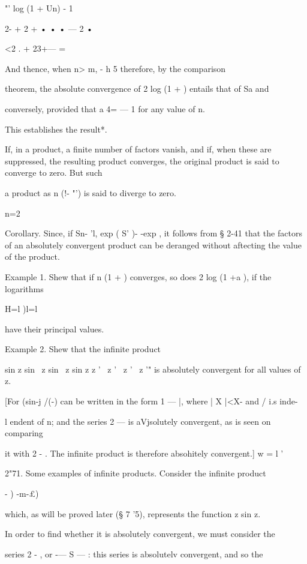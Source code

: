   "' log (1 + Un) - 1



2- + 2 + • • • — 2 •



<2 . + 23+--- =

And thence, when n> m, - h 5 therefore, by the comparison

theorem, the absolute convergence of 2 log (1 + ) entails that of Sa
and

conversely, provided that a 4= — 1 for any value of n.

This establishes the result*.

If, in a product, a finite number of factors vanish, and if, when
these are suppressed, the resulting product converges, the original
product is said to converge to zero. But such

a product as n (!- "') is said to diverge to zero.

n=2

Corollary. Since, if Sn- 'l, exp ( S' )- -exp , it follows from § 2-41
that the factors of an absolutely convergent product can be deranged
without aftecting the value of the product.

Example 1. Shew that if n (1 + ) converges, so does 2 log (1 +a ), if
the logarithms

H=l )l=l

have their principal values.

Example 2. Shew that the infinite product

sin z sin \ z sin \ z sin z z ' \ z ' \ z ' \ z '" is absolutely
convergent for all values of z.

[For (sin-j /(-) can be written in the form 1 — |, where | X |<X- and
/ i.s inde-

l endent of n; and the series 2 — is aVjsolutely convergent, as is
seen on comparing

it with 2 - . The infinite product is therefore absohitely
convergent.] w = l '

2"71. Some examples of infinite products. Consider the infinite
product



  - ) -m-£)



which, as will be proved later (§ 7 '5), represents the function z sin
z.

In order to find whether it is absolutely convergent, we must consider
the

series 2 - , or -— S — : this series is absolutelv convergent, and so
the

